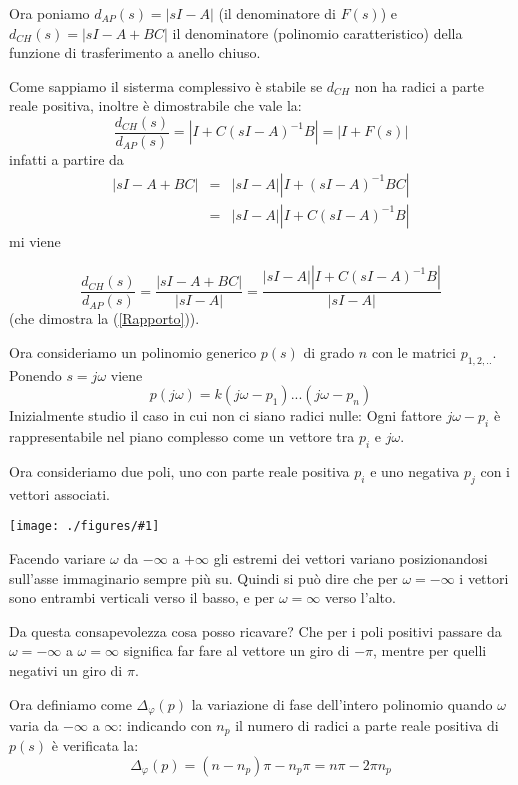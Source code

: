 \documentclass{article}
\newcommand{\incfig}[2]{%
	\texttt{[image: ./figures/\#1]}%
}
\begin{document}
Ora poniamo $d_{AP}(s) = |sI-A|$ (il denominatore di $F(s)$) e $d_{CH}(s) = |sI-A+BC|$ il denominatore
(polinomio caratteristico)
della funzione di trasferimento a anello chiuso.

Come sappiamo il sisterma complessivo è stabile se $d_{CH}$ non ha radici a parte reale positiva,
inoltre è dimostrabile che vale la:
\begin{equation}\label{Rapporto}
  \frac{d_{CH}(s)}{d_{AP}(s)} =   |I +C(sI - A)^{-1}B| = |I+F(s)|
\end{equation}
infatti a partire da 
\begin{align*}
    |sI-A+BC| &=& |sI-A||I +(sI - A)^{-1}BC|\\
                &=&|sI-A||I +C(sI - A)^{-1}B|
\end{align*}
mi viene

\[
    \frac{d_{CH}(s)}{d_{AP}(s)}    = \frac{|sI-A+BC|}{|sI-A|} = \frac{|sI-A||I +C(sI - A)^{-1}B|}{|sI-A|}
\]
(che dimostra la (\ref{Rapporto})).

Ora consideriamo un polinomio generico $p(s)$ di grado $n$ con le matrici $p_{1,2,..}$.
Ponendo $s = j\omega$ viene 
\[ 
    p(j\omega) = {k(j\omega-p_1)...(j\omega - p_n)}
\]
Inizialmente studio il caso in cui non ci siano radici nulle:
Ogni fattore $j\omega - p_i$ è rappresentabile nel piano complesso come un vettore tra $p_i$ e $j\omega$.

Ora consideriamo due poli, uno con parte reale positiva $p_i$ e uno negativa $p_j$  con i vettori associati.

\incfig{pipj.jpeg}{0.5}

Facendo variare $\omega$ da $-\infty$ a $+\infty$ gli estremi dei vettori variano posizionandosi
sull'asse immaginario sempre più su. Quindi si può dire che per $\omega=-\infty$ i vettori sono entrambi verticali verso il basso,
e per $\omega=\infty$ verso l'alto.

Da questa consapevolezza cosa posso ricavare? Che per i poli positivi passare da $\omega=-\infty$ a $\omega=\infty$
significa far fare al vettore un giro di $-\pi$, mentre per quelli negativi un giro di $\pi$.

Ora definiamo come $\Delta_{\varphi}(p)$ la variazione di fase dell'intero polinomio
quando $\omega$ varia da $-\infty$ a $\infty$: indicando con $n_p$ il numero di radici a parte reale positiva di $p(s)$
è verificata la:
\begin{equation}\label{varphi}
    \Delta_{\varphi}(p) = (n-n_p)\pi-n_p\pi=n\pi-2\pi n_p
\end{equation}
\end{document}
